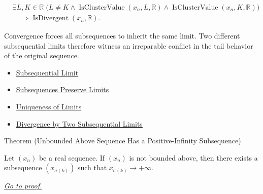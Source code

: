 \begin{remark*}
\[
\begin{aligned}
&\exists L,K\in\mathbb{R}\;
\bigl(
  L\ne K
  \land \operatorname{IsClusterValue}(x_n,L,\mathbb{R})
  \land \operatorname{IsClusterValue}(x_n,K,\mathbb{R})
\bigr)\\
&\quad\Longrightarrow
\operatorname{IsDivergent}(x_n,\mathbb{R}).
\end{aligned}
\]
\end{remark*}

\begin{remark*}[Interpretation]
Convergence forces all subsequences to inherit the same limit. Two different
subsequential limits therefore witness an irreparable conflict in the tail
behavior of the original sequence.
\end{remark*}

\begin{dependencies}
\begin{itemize}
  \item \hyperref[def:subsequential-limit]{Subsequential Limit}
  \item \hyperref[thm:subsequences-preserve-limits]{Subsequences Preserve Limits}
  \item \hyperref[thm:uniqueness-of-limits]{Uniqueness of Limits}
  \item \hyperref[thm:divergence-by-two-subsequential-limits]{Divergence by Two Subsequential Limits}
\end{itemize}
\end{dependencies}


\begin{theorembox}{Theorem (Unbounded Above Sequence Has a Positive-Infinity Subsequence)}
\begin{theorem}
\label{thm:unbounded-above-has-positive-infinity-subsequence}
Let $(x_n)$ be a real sequence. If $(x_n)$ is not bounded above, then
there exists a subsequence $(x_{\sigma(k)})$ such that
$x_{\sigma(k)}\to+\infty$.

\smallskip
\noindent
\hyperref[prf:unbounded-above-has-positive-infinity-subsequence]{\textit{Go to proof.}}
\end{theorem}
\end{theorembox}


